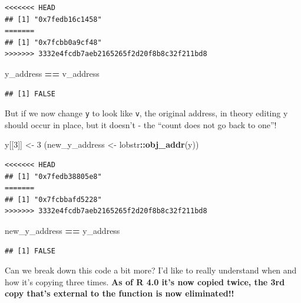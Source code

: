 \documentclass[]{book}
\newenvironment{Shaded}{\begin{snugshade}}{\end{snugshade}}
\newcommand{\DecValTok}[1]{\textcolor[rgb]{0.00,0.00,0.81}{#1}}
\newcommand{\KeywordTok}[1]{\textcolor[rgb]{0.13,0.29,0.53}{\textbf{#1}}}
\newcommand{\NormalTok}[1]{#1}
\newcommand{\OperatorTok}[1]{\textcolor[rgb]{0.81,0.36,0.00}{\textbf{#1}}}
\newcommand{\StringTok}[1]{\textcolor[rgb]{0.31,0.60,0.02}{#1}}
\begin{document}
\begin{verbatim}
<<<<<<< HEAD
## [1] "0x7fedb16c1458"
=======
## [1] "0x7fcbb0a9cf48"
>>>>>>> 3332e4fcdb7aeb2165265f2d20f8b8c32f211bd8
\end{verbatim}

\begin{Shaded}
\begin{Highlighting}[]
\NormalTok{y_address }\OperatorTok{==}\StringTok{ }\NormalTok{v_address}
\end{Highlighting}
\end{Shaded}

\begin{verbatim}
## [1] FALSE
\end{verbatim}

But if we now change \texttt{y} to look like \texttt{v}, the original address, in theory editing y should occur in place, but it doesn't - the ``count does not go back to one''!

\begin{Shaded}
\begin{Highlighting}[]
\NormalTok{y[[}\DecValTok{3}\NormalTok{]] <-}\StringTok{ }\DecValTok{3}
\NormalTok{(new_y_address <-}\StringTok{ }\NormalTok{lobstr}\OperatorTok{::}\KeywordTok{obj_addr}\NormalTok{(y))}
\end{Highlighting}
\end{Shaded}

\begin{verbatim}
<<<<<<< HEAD
## [1] "0x7fedb38805e8"
=======
## [1] "0x7fcbbafd5228"
>>>>>>> 3332e4fcdb7aeb2165265f2d20f8b8c32f211bd8
\end{verbatim}

\begin{Shaded}
\begin{Highlighting}[]
\NormalTok{new_y_address }\OperatorTok{==}\StringTok{ }\NormalTok{y_address}
\end{Highlighting}
\end{Shaded}

\begin{verbatim}
## [1] FALSE
\end{verbatim}

Can we break down this code a bit more? I'd like to really understand when and how it's copying three times. \textbf{As of R 4.0 it's now copied twice, the 3rd copy that's external to the function is now eliminated!!}
\end{document}

